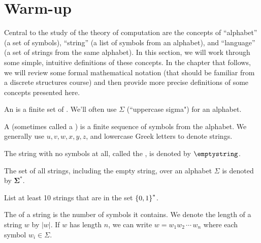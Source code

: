\section{Warm-up}

\begin{discussion}
Central to the study of the theory of computation are the concepts of ``alphabet'' (a set of symbols), ``string'' (a list of symbols from an alphabet), and ``language'' (a set of strings from the same alphabet). In this section, we will work through some simple, intuitive definitions of these concepts. In the chapter that follows, we will review some formal mathematical notation (that should be familiar from a discrete structures course) and then provide more precise definitions of some concepts presented here.
\end{discussion}

\begin{defn}[Alphabet]
An  is a finite set of . We'll often use $\Sigma$ (``uppercase sigma") for an alphabet.
\end{defn}

\begin{defn}[String]
A  (sometimes called a ) is a finite sequence of symbols from the alphabet. We generally use $u, v, w, x, y, z$, and lowercase Greek letters to denote strings. 
\end{defn}

\begin{defn}
The string with no symbols at all, called the , is denoted by $\bm\emptystring$.
\end{defn}

\begin{defn}[$\Sigma^*$]
The set of all strings, including the empty string, over an alphabet $\Sigma$ is denoted by $\bm{\Sigma^*}$.
\end{defn}

\begin{exer}
List at least 10 strings that are in the set $\left\lbrace 0, 1 \right\rbrace^{*}$. 
\end{exer}

\begin{defn}
The  of a string is the number of symbols it contains. We denote the length of a string $w$ by $|w|$. If $w$ has length $n$, we can write $w = w_1 w_2 \,\cdots\, w_n$ where each symbol $w_i \in \Sigma$. 
\end{defn}

